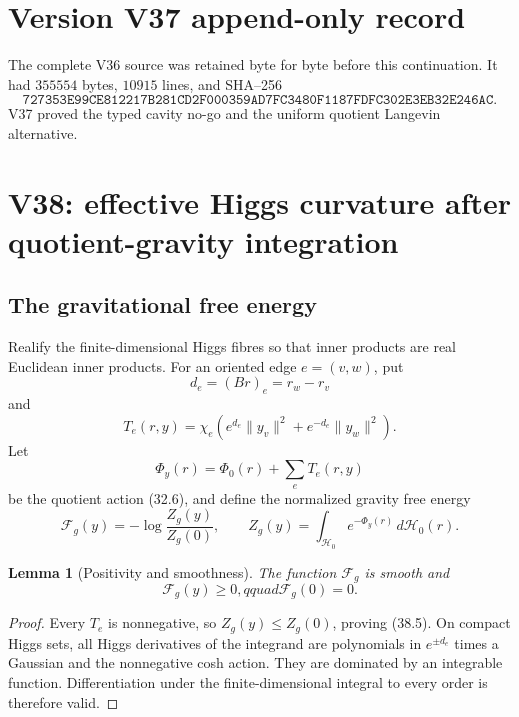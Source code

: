 \documentclass[11pt]{article}
\newtheorem{lemma}[theorem]{Lemma}
\theoremstyle{remark}
\begin{document}
\section*{Version V37 append-only record}
The complete V36 source was retained byte for byte before this
continuation.  It had \(355554\) bytes, \(10915\) lines, and SHA--256
\[
 \texttt{727353E99CE812217B281CD2F000359AD7FC3480F1187FDFC302E3EB32E246AC}.
\]
V37 proved the typed cavity no-go and the uniform quotient Langevin
alternative.


\section{V38: effective Higgs curvature after quotient-gravity integration}
\label{sec:v17v38}

\subsection{The gravitational free energy}

Realify the finite-dimensional Higgs fibres so that inner products are
real Euclidean inner products.  For an oriented edge \(e=(v,w)\), put
\[
 d_e=(Br)_e=r_w-r_v                              \tag{38.1}
\]
and
\[
 T_e(r,y)=\chi_e\left(
 e^{d_e}\|y_v\|^2+e^{-d_e}\|y_w\|^2
 \right).                                         \tag{38.2}
\]
Let
\[
 \Phi_y(r)=\Phi_0(r)+\sum_eT_e(r,y)                \tag{38.3}
\]
be the quotient action (32.6), and define the normalized gravity free
energy
\[
 \mathcal F_g(y)
 =-\log\frac{Z_g(y)}{Z_g(0)},
 \qquad
 Z_g(y)=\int_{\mathcal H_0}e^{-\Phi_y(r)}
 \,d\mathcal H_0(r).                              \tag{38.4}
\]

\begin{lemma}[Positivity and smoothness]
\label{lem:v17v38-basic}
The function \(\mathcal F_g\) is smooth and
\[
 \mathcal F_g(y)\geq0,qquad \mathcal F_g(0)=0.   \tag{38.5}
\]
\end{lemma}

\begin{proof}
Every \(T_e\) is nonnegative, so
\(Z_g(y)\leq Z_g(0)\), proving (38.5).  On compact Higgs sets, all
Higgs derivatives of the integrand are polynomials in
\(e^{\pm d_e}\) times a Gaussian and the nonnegative cosh action.  They
are dominated by an integrable function.  Differentiation under the
finite-dimensional integral to every order is therefore valid.
\end{proof}
\end{document}
